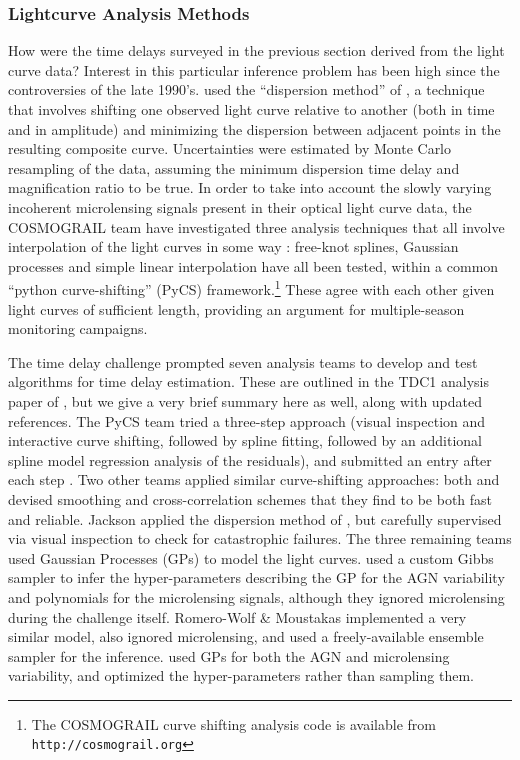 
\subsubsection{Lightcurve Analysis Methods}

How were the time delays surveyed in the previous section derived from
the light curve data? Interest in this particular inference problem
has been high since the controversies of the late
1990's. \citet{Fas++99} used the ``dispersion method'' of
\citet{Pelt++96}, a technique that involves shifting one observed
light curve relative to another (both in time and in amplitude) and
minimizing the dispersion between adjacent points in the resulting
composite curve. Uncertainties were estimated by Monte Carlo
resampling of the data, assuming the minimum dispersion time delay and
magnification ratio to be true. In order to take into account the
slowly varying incoherent microlensing signals present in their
optical light curve data, the COSMOGRAIL team have investigated three
analysis techniques that all involve interpolation of the light curves
in some way \citep{TCM13}: free-knot splines, Gaussian processes and
simple linear interpolation have all been tested, within a common
``python curve-shifting'' (PyCS) framework.\footnote{The COSMOGRAIL
curve shifting analysis code is available from
\texttt{http://cosmograil.org}} These agree with each other given
light curves of sufficient length, providing an argument for
multiple-season monitoring campaigns.

The time delay challenge prompted seven analysis teams to develop and
test algorithms for time delay estimation. These are outlined in the
TDC1 analysis paper of \citet{LiaoEtal2015}, but we give a very brief
summary here as well, along with updated references. The PyCS team tried
a three-step approach (visual inspection and interactive curve shifting,
followed by spline fitting, followed  by an additional spline model
regression analysis of the residuals), and submitted an entry after each
step \citep{BonvinEtal2016}. Two other teams applied similar
curve-shifting approaches: both \citet{A+S2015} and \citet{RK++2015}
devised smoothing and cross-correlation schemes that they find to be
both fast and reliable. Jackson applied the dispersion method of
\citet{Pelt++96}, but carefully supervised via visual inspection to
check for  catastrophic failures.  The three remaining teams used
Gaussian Processes (GPs) to model the light curves. \citet{TakEtal2016}
used a custom Gibbs sampler to infer the hyper-parameters describing the
GP for the AGN variability and polynomials for the microlensing signals,
although they ignored microlensing during the challenge itself.
Romero-Wolf \& Moustakas implemented a very similar model, also ignored
microlensing, and used a freely-available ensemble sampler for the
inference. \citet{H+L2014} used GPs for both the AGN and microlensing
variability, and optimized the hyper-parameters rather than sampling
them.

